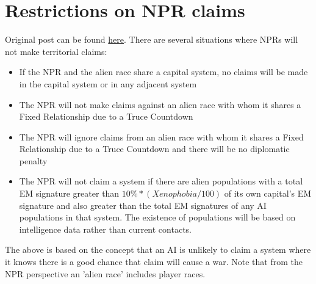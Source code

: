 \documentclass[10pt,a4paper,oneside]{article}
\begin{document}
\section{Restrictions on NPR claims}\label{5_restriction_on_npr_claimes}
Original post can be found
\href{http://aurora2.pentarch.org/index.php?topic=8495.msg118404#msg118404}{here}.
\newline\newline
There are several situations where NPRs will not make territorial claims:
\begin{itemize}
	\item If the NPR and the alien race share a capital system, no claims will be made in the capital system or in any adjacent system
	\item The NPR will not make claims against an alien race with whom it shares a Fixed Relationship due to a Truce Countdown
	\item The NPR will ignore claims from an alien race with whom it shares a Fixed Relationship due to a Truce Countdown and there will be no diplomatic penalty
	\item The NPR will not claim a system if there are alien populations with a total EM signature greater than \( 10\% * (Xenophobia / 100) \) of its own capital's EM signature and also greater than the total EM signatures of any AI populations in that system. The existence of populations will be based on intelligence data rather than current contacts.
\end{itemize}
The above is based on the concept that an AI is unlikely to claim a system where it knows there is a good chance that claim will cause a war. Note that from the NPR perspective an 'alien race' includes player races.
\end{document}
